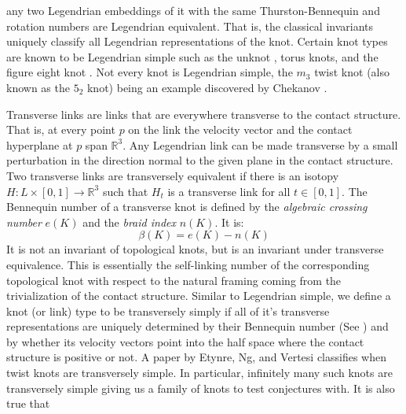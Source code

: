 \documentclass{article}
\theoremstyle{plain}
\begin{document}
        any two Legendrian embeddings of it with the same Thurston-Bennequin
        and rotation numbers are Legendrian equivalent. That is, the classical
        invariants uniquely classify all Legendrian representations of the knot.
        Certain knot types are known to be Legendrian simple such as the unknot
        \cite{EliashbergFraserClassificationTopTrivialLegKnots}, torus knots,
        and the figure eight knot \cite{EtnyreHondaContactTopologyI}.
        Not every knot is Legendrian simple, the $m_{3}$ twist knot (also
        known as the $5_{2}$ knot) being an example discovered by Chekanov
        \cite{ChekanovDifAlgOfLegLinks}.
        \par\hfill\par
        Transverse links are links that are everywhere transverse to the
        contact structure. That is, at every point $p$ on the link the velocity
        vector and the contact hyperplane at $p$ span $\mathbb{R}^{3}$. Any Legendrian
        link can be made transverse by a small perturbation in the direction
        normal to the given plane in the contact structure.
        Two transverse links are transversely equivalent if there is an
        isotopy $H:L\times[0,1]\rightarrow\mathbb{R}^{3}$ such that $H_{t}$ is a
        transverse link for all $t\in[0,1]$. The Bennequin number of a
        transverse knot is defined by the \textit{algebraic crossing number}
        $e(K)$ and the \textit{braid index} $n(K)$. It is:
        \begin{equation}
            \beta(K)=e(K)-n(K)
        \end{equation}
        It is not an invariant of topological knots, but is an invariant under
        transverse equivalence. This is essentially the self-linking number of
        the corresponding topological knot with respect to the natural framing
        coming from the trivialization of the contact structure.
        Similar to Legendrian simple, we define a knot
        (or link) type to be transversely simply if all of it's transverse
        representations are uniquely determined by their Bennequin number
        (See \cite{BirmanWrinkleTransversallySimpleKnots}) and by whether its
        velocity vectors point into the half space where the contact structure
        is positive or not. A paper by Etynre, Ng, and Vertesi
        \cite{EtnyreEtAlLegendrianAndTransverseTwistKnots}
        classifies when twist knots are transversely simple. In
        particular, infinitely many such knots are transversely simple giving
        us a family of knots to test conjectures with. It is also true that
\end{document}
